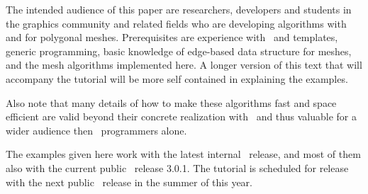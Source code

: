 The intended audience of this paper are researchers, developers and
students in the graphics community and related fields who are
developing algorithms with and for polygonal meshes. Prerequisites are
experience with \CC\ and templates, generic programming, basic
knowledge of edge-based data structure for meshes, and the mesh
algorithms implemented here. A longer version of this text that will
accompany the tutorial will be more self contained in explaining the
examples.

Also note that many details of how to make these algorithms fast and
space efficient are valid beyond their concrete realization with
\cgal\ and thus valuable for a wider audience then \cgal\ programmers
alone.

The examples given here work with the latest internal \cgal\ release,
and most of them also with the current public \cgal\ release
3.0.1. The tutorial is scheduled for release with the next public
\cgal\ release in the summer of this year.





